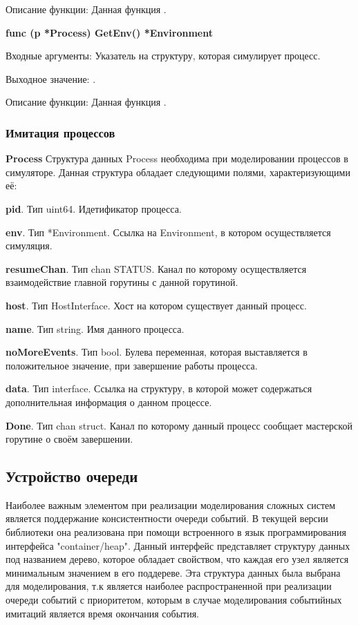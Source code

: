 Описание функции: Данная функция .

\textbf{func (p *Process) GetEnv() *Environment}

Входные аргументы: Указатель на структуру, которая симулирует процесс.

Выходное значение: .

Описание функции: Данная функция .

\subsubsection{Имитация процессов}
\textbf{Process}
Структура данных Process необходима при моделировании процессов в симуляторе. Данная структура обладает следующими полями, характеризующими  её:

\textbf{	pid}. Тип uint64. Идетификатор процесса. 

\textbf{	env}. Тип        *Environment. Ссылка на Environment, в котором осуществляется симуляция. 

\textbf{	resumeChan}. Тип chan STATUS. Канал по которому осуществляется взаимодействие главной горутины с данной горутиной. 

\textbf{	host}. Тип       HostInterface. Хост на котором существует данный процесс. 

\textbf{	name}. Тип         string. Имя данного процесса. 

\textbf{	noMoreEvents}. Тип bool. Булева переменная, которая выставляется в положительное значение, при завершение работы процесса.

\textbf{	data}. Тип         interface. Ссылка на  структуру, в  которой может содержаться дополнительная информация о данном процессе.

\textbf{	Done}. Тип chan struct. Канал по которому данный процесс сообщает мастерской горутине о своём завершении. 



\subsection{Устройство очереди}

Наиболее важным элементом при реализации моделирования сложных систем является поддержание консистентности очереди событий. В текущей версии библиотеки она реализована при помощи встроенного в язык программирования интерфейса "container/heap". Данный интерфейс представляет структуру данных под названием дерево, которое обладает свойством, что каждая его узел является минимальным значением в его поддереве. Эта структура данных была выбрана для моделирования, т.к является наиболее распространенной при реализации очереди событий с приоритетом, которым в случае моделирования событийных имитаций является время окончания события. 

